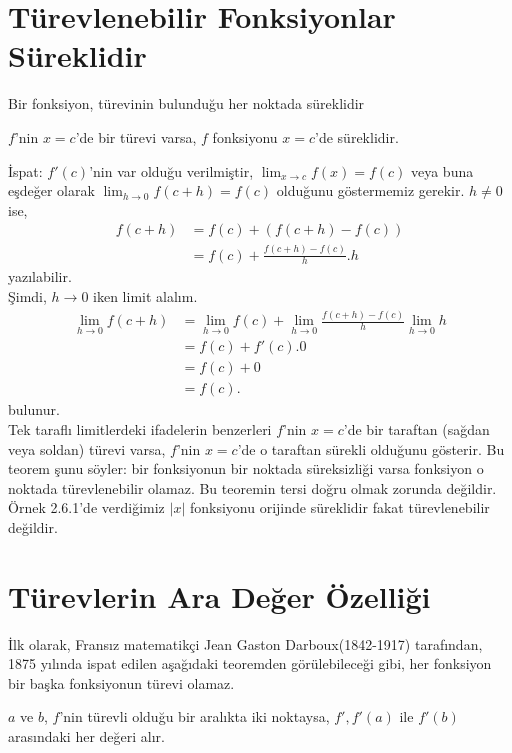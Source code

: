 \section{\protect Türevlenebilir Fonksiyonlar Süreklidir}\label{bolumetiketi}
Bir fonksiyon, türevinin bulunduğu her noktada süreklidir
\begin{teorem}
	$f$'nin $x=c$'de bir türevi varsa, $f$ fonksiyonu $x=c$'de süreklidir.
\end{teorem}
İspat: $f'(c)$'nin var olduğu verilmiştir, $\lim_{x \rightarrow c}f(x) = f(c)$ veya buna eşdeğer olarak $\lim_{h \rightarrow 0}f(c+h)=f(c)$ olduğunu göstermemiz gerekir. $h\ne0$ ise,
		\begin{equation*}
		\begin{split}
		  f(c+h) & = f(c) + (f(c+h)-f(c))\\
		   &=  f(c)+\frac{f(c+h)-f(c)}{h}.h
		\end{split}
		\end{equation*}	
yazılabilir.\\
	
Şimdi, $h \rightarrow 0$ iken limit alalım.
		\begin{equation*}
		\begin{split}
		 \lim_{h \rightarrow 0}f(c+h) &= \lim_{h \rightarrow 0}f(c) +\lim_{h \rightarrow 0}\frac{f(c+h)-f(c)}{h}\lim_{h \rightarrow 0}h\\
		&=f(c)+f'(c).0\\
		&=f(c)+0\\
		&=f(c).
		\end{split}
		\end{equation*}	
bulunur.\\
	Tek taraflı limitlerdeki ifadelerin benzerleri $f$'nin $x=c$'de bir taraftan (sağdan veya soldan) türevi varsa, $f$'nin $x=c$'de o taraftan sürekli olduğunu gösterir. Bu teorem şunu söyler: bir fonksiyonun bir noktada süreksizliği varsa fonksiyon o noktada türevlenebilir olamaz. Bu teoremin tersi  doğru olmak zorunda değildir. Örnek 2.6.1'de verdiğimiz $|x|$ fonksiyonu orijinde süreklidir fakat türevlenebilir değildir.\\
\section{\protect Türevlerin Ara Değer Özelliği}\label{bolumetiketi}
İlk olarak, Fransız matematikçi Jean Gaston Darboux(1842-1917) tarafından, 1875 yılında ispat edilen aşağıdaki teoremden görülebileceği gibi, her fonksiyon bir başka fonksiyonun türevi olamaz.
\begin{teorem}
	$a$ ve $b$, $f$'nin türevli olduğu bir aralıkta iki noktaysa, $f',f'(a)$ ile $f'(b)$ arasındaki her değeri alır.
\end{teorem}

